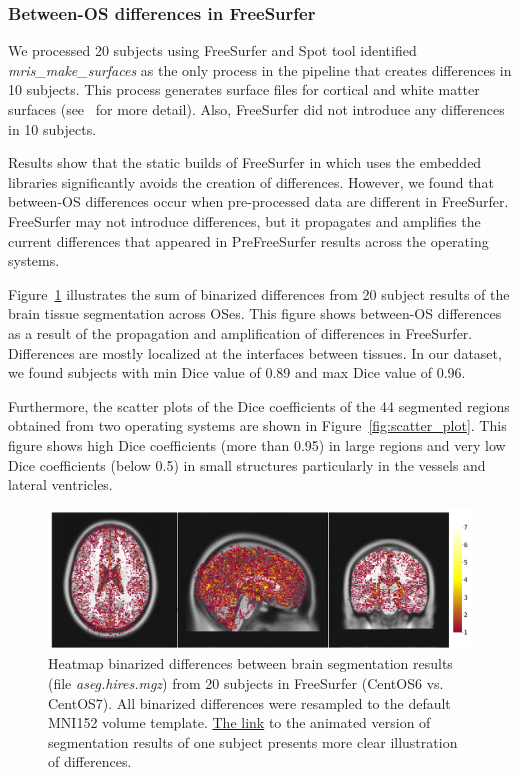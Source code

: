 \documentclass[a4paper,num-refs]{oup-contemporary}
\begin{document}
\subsubsection{Between-OS differences in FreeSurfer} 

We processed 20 subjects using FreeSurfer and 
Spot tool identified \emph{mris\_make\_surfaces} as the only process in 
the pipeline that creates differences in 10 subjects.
This process generates surface files for cortical and white matter surfaces 
(see~\cite{fischl2012freesurfer} for more detail). 
Also, FreeSurfer did not introduce any differences in 10 subjects. 

Results show that the static builds of FreeSurfer in which uses the embedded libraries 
significantly avoids the creation of differences.
However, we found that between-OS differences occur when pre-processed data are different in FreeSurfer. 
FreeSurfer may not introduce differences, but it propagates and amplifies 
the current differences that appeared in PreFreeSurfer results across the operating systems.

Figure~\ref{fig:tissue_class} illustrates the sum of binarized differences 
from 20 subject results of the brain tissue segmentation across OSes.
This figure shows between-OS differences  
as a result of the propagation and amplification of differences in FreeSurfer. 
Differences are mostly localized at the interfaces between tissues.
In our dataset, we found subjects with min Dice value of 0.89 and max Dice  
value of 0.96.

Furthermore, the scatter plots of the Dice coefficients of the 44 segmented regions obtained 
from two operating systems are shown in Figure~\ref{fig:scatter_plot}.
This figure shows high Dice coefficients (more than 0.95) in large regions and very low 
Dice coefficients (below 0.5) in small structures particularly in the vessels and lateral ventricles.


\begin{figure}
\centering
  \includegraphics[width=\columnwidth]{images/brain_segmentation_mni.png} 
  \caption{Heatmap binarized differences between brain segmentation results (file \emph{aseg.hires.mgz}) from 
          20 subjects in FreeSurfer (CentOS6 vs. CentOS7). 
          All binarized differences were resampled to the default MNI152 volume template.
          \href{https://github.com/ali4006/HCP-reproducibility-paper/blob/master/images/fs_brain_segmentation.gif}
          {The link} to the animated version of segmentation results of one subject presents more clear illustration of differences.} 
  \label{fig:tissue_class}
\end{figure}
\end{document}
